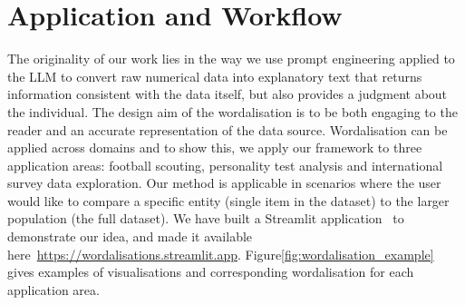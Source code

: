 \documentclass{article}
\begin{document}



\section{Application and Workflow}
\label{sec:applications}

 The originality of our work lies in the way we use prompt engineering applied to the LLM to convert raw numerical data into explanatory text that returns information consistent with the data itself, but also provides a judgment about the individual. The design aim of the wordalisation is to be both engaging to the reader and an accurate representation of the data source. Wordalisation can be applied across domains and to show this, we apply our framework to three application areas: football scouting, personality test analysis and international survey data exploration. Our method is applicable in scenarios where the user would like to compare a specific entity (single item in the dataset) to the larger population (the full dataset). We have built a Streamlit application~\cite{richards2023streamlit} to demonstrate our idea, and made it available here~\url{https://wordalisations.streamlit.app}.  Figure\ref{fig:wordalisation_example} gives examples of visualisations and corresponding wordalisation for each application area. 
\end{document}
